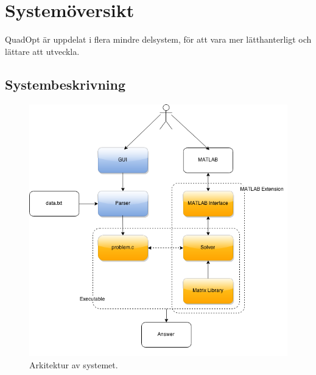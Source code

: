 \newpage
\section{Systemöversikt}
QuadOpt är uppdelat i flera mindre delsystem, för att vara mer lätthanterligt och lättare att utveckla.

\subsection{Systembeskrivning}


\begin{figure}[h]
	\begin{center}
		\includegraphics[scale=0.5]{bilder/arkitektur.png}
	\end{center}
	\caption{Arkitektur av systemet.}
\end{figure}

